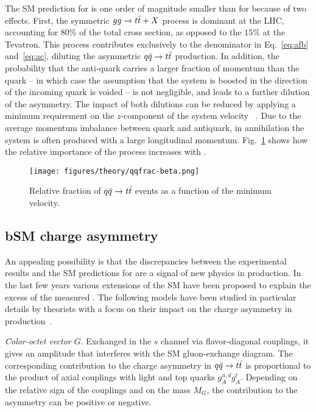The SM prediction for \ac{} is one order of magnitude smaller than for
\afb{} because of two effects. First, the symmetric $gg\to\mbox{$t\bar{t}$}{}+X$
process is dominant at the LHC, accounting for $80\%$ of the total
cross section, as opposed to the $15\%$ at the Tevatron. This process
contributes exclusively to the denominator in Eq.~\ref{eq:afb}
and~\ref{eq:ac}, diluting the asymmetric $\mbox{$q\bar{q}$}{}\to\mbox{$t\bar{t}$}{}$
production. In addition, the probability that the anti-quark carries a
larger fraction of momentum than the quark -- in which case the
assumption that the \ttbar{} system is boosted in the direction of the
incoming quark is voided -- is not negligible, and leads to a further
dilution of the asymmetry. The impact of both
dilutions can be reduced by applying a minimum requirement on the
$z$-component of the \ttbar{} system velocity \betatt{}~\cite{AguilarSaavedra:2011cp}. Due to the average momentum imbalance
between quark and antiquark, in \qqbar{} annihilation the \ttbar{}
system is often produced with a large longitudinal
momentum. Fig.~\ref{fig:qqbarfrac} shows how the relative importance
of the \qqbar{} process increases with \betatt{}.

\begin{figure}[!htb]
  \centering
  \texttt{[image: figures/theory/qqfrac-beta.png]} 
  \caption{Relative fraction of $\mbox{$q\bar{q}$}{}\to\mbox{$t\bar{t}$}{}$ events as a function of the
    minimum \ttbar{} velocity.} 
  \label{fig:qqbarfrac}
\end{figure}

\subsection{bSM charge asymmetry}
\label{sec:bsmca}

An appealing possibility is that the discrepancies between the
experimental results and the SM predictions for \afb{} are a signal of
new physics in \ttbar{} production. In the last few years various
extensions of the SM have been proposed to explain the excess of the
measured \afb{}. The following models have been studied in particular
details by theorists with a focus on their impact on the charge
asymmetry in \ttbar{} production~\cite{Aguilar-Saavedra:2014kpa}. 

{\em Color-octet vector $G$}. Exchanged in the $s$ channel via
flavor-diagonal couplings, it gives 
an amplitude that interferes with the SM gluon-exchange diagram. The
corresponding contribution to the charge asymmetry in
$\mbox{$q\bar{q}$}{}\to\mbox{$t\bar{t}$}{}$ is proportional to the product of axial
couplings with light and top quarks $g_A^{u,d}g_A^t$. Depending on the
relative sign of the couplings and on the mass $M_G$, the contribution
to the asymmetry can be positive or negative. 

